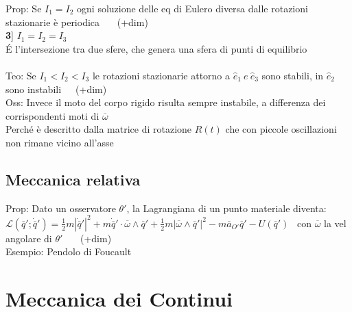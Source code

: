 \documentclass{article}
\theoremstyle{unnumbered}
\theoremstyle{unnumbered1}
\begin{document}
%
Prop: Se $I_1=I_2$ ogni soluzione delle eq di Eulero diversa dalle rotazioni stazionarie è periodica \ \ \ (+dim)\\
%
%
%
\textbf{3}] $I_1=I_2=I_3$\\
É l'intersezione tra due sfere, che genera una sfera di punti di equilibrio\\ \\
%
%
%
Teo: Se $I_1<I_2<I_3$ le rotazioni stazionarie attorno a $\hat{e}_1 \ e \ \hat{e}_3$ sono stabili, in $\hat{e}_2$ sono instabili\ \ \ (+dim) \\
%
Oss: Invece il moto del corpo rigido risulta sempre instabile, a differenza dei corrispondenti moti di $\overline{\omega}$\\
\phantom{Oss: }Perché è descritto dalla matrice di rotazione $R(t)$ che con piccole oscillazioni non rimane vicino all'asse
%
%
%
\subsection{Meccanica relativa}
%
Prop: Dato un osservatore $\theta'$, la Lagrangiana di un punto materiale diventa: \\ 
\phantom{Prop: }$\mathcal{L}(\overline{q}';\dot{\overline{q}}')=\frac{1}{2}m|\dot{\overline{q}}'|^2 + m\dot{\overline{q}}'\cdot\overline{\omega}\wedge\overline{q}' + \frac{1}{2}m|\overline{\omega}\wedge\overline{q}'|^2 -m\overline{a}_{O'}\overline{q}'-U(\overline{q}')$ \ con $\overline{\omega}$ la vel angolare di $\theta'$ \ \ \ (+dim)\\
%
%
%
Esempio: Pendolo di Foucault \\
%
%
%
\section{Meccanica dei Continui}

\end{document}
